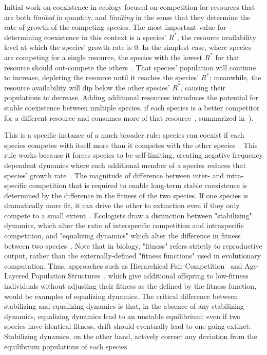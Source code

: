 Initial work on coexistence in ecology focused on competition for resources that are both \textit{limited} in quantity, and \textit{limiting} in the sense that they determine the rate of growth of the competing species. The most important value for determining coexistence in this context is a species' $R^{*}$, the resource availability level at which the species' growth rate is 0. In the simplest case, where species are competing for a single resource, the species with the lowest $R^*$ for that resource should out-compete the others~\cite{grover_resource_1997}. That species' population will continue to increase, depleting the resource until it reaches the species' $R^*$; meanwhile, the resource availability will dip below the other species' $R^*$, causing their populations to decrease. Adding additional resources introduces the potential for stable coexistence between multiple species, if each species is a better competitor for a different resource and consumes more of that resource~\cite{chase_ecological_2003}, summarized in~\cite{letten_linking_2017}). 

This is a specific instance of a much broader rule: species can coexist if each species competes with itself more than it competes with the other species~\cite{chesson_mechanisms_2000}. This rule works because it forces species to be self-limiting, creating negative frequency dependent dynamics where each additional member of a species reduces that species' growth rate~\cite{adler_niche_2007}. The magnitude of difference between inter- and intra-specific competition that is required to enable long-term stable coexistence is determined by the difference in the fitness of the two species. If one species is dramatically more fit, it can drive the other to extinction even if they only compete to a small extent~\cite{chesson_mechanisms_2000}. Ecologists draw a distinction between "stabilizing" dynamics, which alter the ratio of interspecific competition and intraspecific competition, and "equalizing dynamics" which alter the difference in fitness between two species~\cite{adler_niche_2007}. Note that in biology, "fitness" refers strictly to reproductive output, rather than the externally-defined "fitness functions" used in evolutionary computation. Thus, approaches such as Hierarchical Fair Competition~\cite{hu_hierarchical_2005} and Age-Layered Population Structures~\cite{hornby_alps:_2006}, which give additional offspring to low-fitness individuals without adjusting their fitness as the defined by the fitness function, would be examples of equalizing dynamics. The critical difference between stabilizing and equalizing dynamics is that, in the absence of any stabilizing dynamics, equalizing dynamics lead to an unstable equilibrium; even if two species have identical fitness, drift should eventually lead to one going extinct. Stabilizing dynamics, on the other hand, actively correct any deviation from the equilibrium populations of each species.

